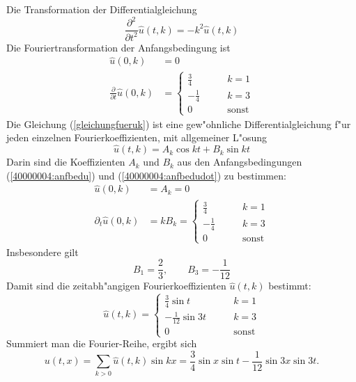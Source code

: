 {\begin{loesung}
Die Transformation der Differentialgleichung 
\begin{equation}
\frac{\partial^2}{\partial t^2}\hat u(t,k)
=-k^2\hat u(t,k)
\label{gleichungfueruk}
\end{equation}
Die Fouriertransformation der Anfangsbedingung ist
\begin{align}
\hat u(0,k)&=0\label{40000004:anfbedu}\\
\frac{\partial}{\partial t}\hat u(0,k)&=
\begin{cases}
\frac34&\qquad k= 1\\
-\frac14&\qquad k= 3\\
0&\qquad \text{sonst}
\end{cases}
\label{40000004:anfbedudot}
\end{align}
Die Gleichung
(\ref{gleichungfueruk})
ist eine gew"ohnliche Differentialgleichung f"ur jeden
einzelnen Fourierkoeffizienten, mit allgemeiner L"osung
\[
\hat u(t,k)=A_k\cos kt+B_k\sin kt
\]
Darin sind die Koeffizienten $A_k$ und $B_k$ aus den Anfangsbedingungen
(\ref{40000004:anfbedu}) und (\ref{40000004:anfbedudot}) zu bestimmen:
\begin{align*}
\hat u(0,k)&=A_k=0\\
\partial_t \hat u(0,k)&=kB_k=
\begin{cases}
\frac34&\qquad k= 1\\
-\frac14&\qquad k= 3\\
0&\qquad \text{sonst}
\end{cases}
\end{align*}
Insbesondere gilt
\[
B_1=\frac23,\qquad B_3=-\frac1{12}
\]
Damit sind die zeitabh"angigen Fourierkoeffizienten $\hat u(t,k)$ bestimmt:
\[
\hat u(t,k)=
\begin{cases}
\frac34\sin t &\qquad k= 1\\
-\frac1{12}\sin 3t&\qquad k= 3\\
0&\qquad \text{sonst}
\end{cases}
\]
Summiert man die Fourier-Reihe, ergibt sich
\[
u(t,x)=\sum_{k>0}\hat u(t,k) \sin kx
= \frac34\sin x \sin t -\frac1{12}\sin 3x \sin 3t.
\]
\end{loesung}
}{}


